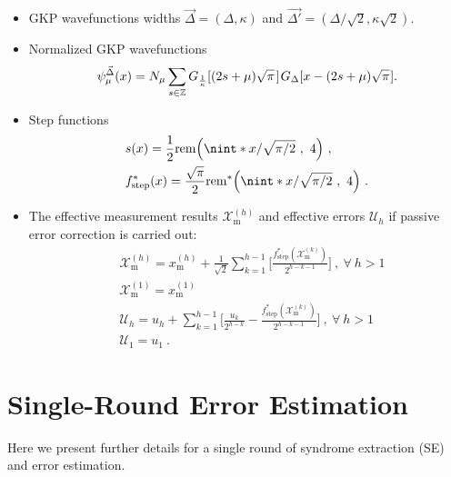 \documentclass[prx,reprint,superscriptaddress,longbibliography,floatfix,nofootinbib]{revtex4-1}
\DeclarePairedDelimiter{\nint}\lfloor\rceil
\begin{document}
\begin{itemize}
\item GKP wavefunctions widths $\vec{\Delta}=(\Delta,\kappa)$ and $\vec{\Delta'}=(\Delta/\sqrt{2},\kappa\sqrt{2})$.
\item Normalized GKP wavefunctions
\begin{equation}
   \psi_{\mu}^{\vec{\Delta}} (x) = N_\mu \sum_{s \in \mathbb{Z}} G_{\frac{1}{\kappa}} [(2s+\mu)\sqrt{\pi} \hspace{0.04cm}] \hspace{0.03cm} G_{\Delta}[x-(2s+\mu)\sqrt{\pi} \hspace{0.02cm}]. 
\end{equation}
\item Step functions
\begin{equation}
\begin{split}
        & s(x) = \frac{1}{2}\mathrm{rem}\Big{(}\nint*{x/\sqrt{\pi/2}} \ , \ 4 \Big{)} \ , \\
        & f^{*}_{\text{step}}(x) = \frac{\sqrt{\pi}}{2}\mathrm{rem}^{*}\Big{(}\nint*{x/\sqrt{\pi/2}} \ , \ 4 \Big{)} \ .
        \end{split}
\end{equation}
\item The effective measurement results $\mathcal{X}_{\text{m}}^{(h)}$ and effective errors $\mathcal{U}_{h}$ if passive error correction is carried out:
\begin{equation}
    \begin{split}
    & \mathcal{X}^{(h)}_{\text{m}} = x^{(h)}_{\text{m}} + \frac{1}{\sqrt{2}}\sum_{k=1}^{h-1}\Big[\frac{f_\text{step}^{*}(\mathcal{X}_\text{m}^{(k)})}{2^{h-k-1}}\Big] \ , \ \forall \ h > 1  \\
    & \mathcal{X}^{(1)}_{\text{m}} = x^{(1)}_{\text{m}} \\
    & \mathcal{U}_h = u_h + \sum_{k=1}^{h-1}\Big[\frac{u_k}{2^{h-k}} - \frac{f_\text{step}^{*}(\mathcal{X}_\text{m}^{(k)})}{2^{h-k-1}}\Big] \ , \ \forall \ h > 1 \\
    & \mathcal{U}_1 = u_1 \ . 
    \end{split}
    \label{eq:XU1}
\end{equation}
\end{itemize}

\section{Single-Round Error Estimation}
\label{appendix-single-step}
Here we present further details for a single round of syndrome extraction (SE) and error estimation. 
\end{document}
